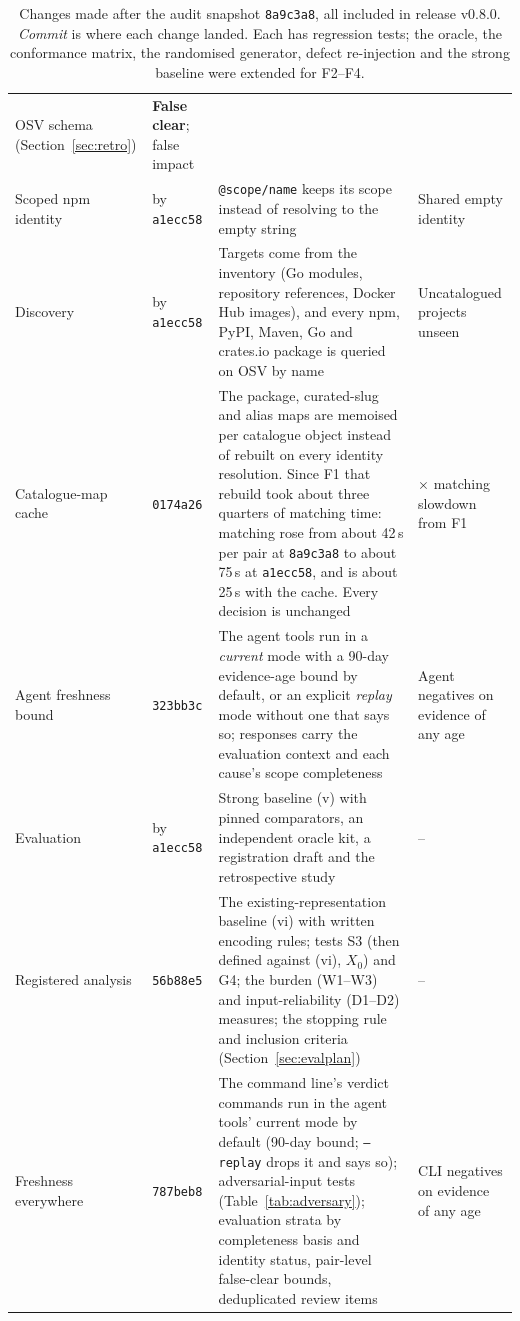 \documentclass[11pt,a4paper]{article}
\newcommand{\code}[1]{\texttt{#1}}
\newcommand{\pincommit}{\code{8a9c3a8}}
\newcommand{\release}{v0.8.0}
\begin{document}
\begin{table}[h]
\begin{tabularx}{\linewidth}{@{}>{\raggedright\arraybackslash}p{2.4cm} >{\raggedright\arraybackslash}p{1.2cm} >{\raggedright\arraybackslash}X >{\raggedright\arraybackslash}p{2.3cm}@{}}
  OSV schema (Section~\ref{sec:retro}) & \textbf{False clear}; false
  impact \\
Scoped npm identity & by \code{a1ecc58} & \code{@scope/name} keeps its scope instead of
  resolving to the empty string & Shared empty identity \\
Discovery & by \code{a1ecc58} & Targets come from the inventory (Go modules, repository
  references, Docker Hub images), and every npm, PyPI, Maven, Go and
  crates.io package is queried on OSV by name & Uncatalogued projects
  unseen \\
Catalogue-map cache & \code{0174a26} & The
  package, curated-slug and alias maps are memoised per catalogue
  object instead of rebuilt on every identity resolution. Since F1
  that rebuild took about three quarters of matching time: matching
  rose from about 42\,\textmu{}s per pair at \pincommit{} to about
  75\,\textmu{}s at \code{a1ecc58}, and is about 25\,\textmu{}s with the
  cache. Every decision is unchanged &
  1.8$\times$ matching slowdown from F1 \\
Agent freshness bound & \code{323bb3c} & The
  agent tools run in a \emph{current} mode with a 90-day evidence-age
  bound by default, or an explicit \emph{replay} mode without one that
  says so; responses carry the evaluation context and each cause's
  scope completeness & Agent negatives on evidence of any age \\
Evaluation & by \code{a1ecc58} & Strong baseline (v) with pinned comparators, an
  independent oracle kit, a registration draft and the retrospective
  study & -- \\
Registered analysis & \code{56b88e5} & The
  existing-representation baseline (vi) with written encoding rules;
  tests S3 (then defined against (vi), $X_0$) and G4; the burden (W1--W3) and input-reliability (D1--D2)
  measures; the stopping rule and inclusion criteria
  (Section~\ref{sec:evalplan}) & -- \\
Freshness everywhere & \code{787beb8} & The
  command line's verdict commands run in the agent tools' current mode
  by default (90-day bound; \code{--replay} drops it and says so);
  adversarial-input tests (Table~\ref{tab:adversary}); evaluation strata
  by completeness basis and identity status, pair-level false-clear
  bounds, deduplicated review items & CLI negatives on evidence of any
  age \\
\bottomrule
\end{tabularx}
\caption{Changes made after the audit snapshot \pincommit{}, all
included in release \release{}. \emph{Commit} is where each
change landed. Each has regression tests; the oracle, the conformance
matrix, the randomised generator, defect re-injection and the strong
baseline were extended for F2--F4.}
\label{tab:since}
\end{table}
\end{document}
